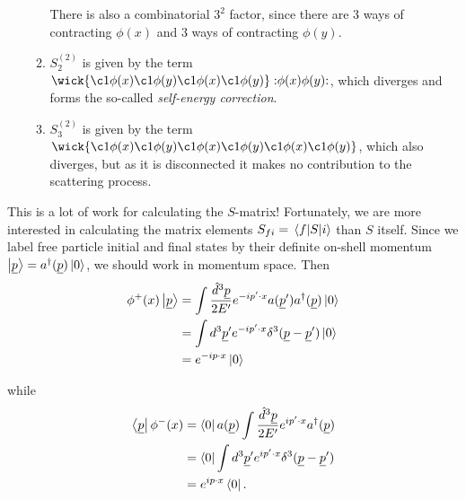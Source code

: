 \documentclass{article}
\newcommand{\normord}[1]{:\mathrel{#1}:}
\begin{document}
\begin{enumerate}
\begin{enumerate}
        There is also a combinatorial $3^2$ factor, since there are 3 ways of contracting $\phi(x)$ and 3 ways of contracting $\phi(y)$.
        \item $S_2^{(2)}$ is given by the term $\wick{\c1\phi(x)\c1\phi(y)\c1\phi(x)\c1\phi(y)} \normord{\phi(x)\phi(y)}$, which diverges and forms the so-called \textit{self-energy correction}.
        \item $S_3^{(2)}$ is given by the term $\wick{\c1\phi(x)\c1\phi(y)\c1\phi(x)\c1\phi(y)\c1\phi(x)\c1\phi(y)}$, which also diverges, but as it is disconnected it makes no contribution to the scattering process.
    \end{enumerate}
\end{enumerate}

This is a lot of work for calculating the $S$-matrix! Fortunately, we are more interested in calculating the matrix elements $S_{fi} = \mel{f}{S}{i}$ than $S$ itself. Since we label free particle initial and final states by their definite on-shell momentum $\ket{\underline{p}} = a^\dagger(\underline{p})\ket{0}$, we should work in momentum space. Then
\begin{equation} \label{eq:phiplusp}
\begin{aligned}
    \phi^+(x)\ket{\underline{p}} &= \int  \frac{\hat{d}^3 \underline{p}}{2E'} e^{-ip'\cdot x} a(\underline{p}')a^\dagger(\underline{p})\ket{0} \\
    &= \int d^3 \underline{p}'   e^{-ip'\cdot x} \delta^3(\underline{p}-\underline{p}')\ket{0} \\
    &= e^{-ip\cdot x}\ket{0}
\end{aligned}
\end{equation}

while
\begin{equation} \label{eq:phiminusp}
\begin{aligned}
    \bra{\underline{p}}\phi^-(x) &= \bra{0} a(\underline{p}) \int \frac{\hat{d}^3 \underline{p}}{2E'} e^{ip'\cdot x} a^\dagger(\underline{p}) \\
    &= \bra{0} \int d^3 \underline{p}' e^{ip'\cdot x} \delta^3(\underline{p}-\underline{p}') \\
    &= e^{ip\cdot x} \bra{0}.
\end{aligned}
\end{equation}
\end{document}
